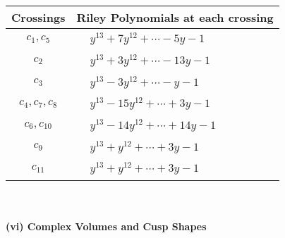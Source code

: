 \documentclass[1p]{elsarticle_modified}
\theoremstyle{definition}
\begin{document}
\begin{tabular}{m{50pt}|m{274pt}}
Crossings & \hspace{64pt}Riley Polynomials at each crossing \\
\hline $$\begin{aligned}c_{1},c_{5}\end{aligned}$$&$\begin{aligned}
&y^{13}+7 y^{12}+\cdots-5 y-1
\end{aligned}$\\
\hline $$\begin{aligned}c_{2}\end{aligned}$$&$\begin{aligned}
&y^{13}+3 y^{12}+\cdots-13 y-1
\end{aligned}$\\
\hline $$\begin{aligned}c_{3}\end{aligned}$$&$\begin{aligned}
&y^{13}-3 y^{12}+\cdots- y-1
\end{aligned}$\\
\hline $$\begin{aligned}c_{4},c_{7},c_{8}\end{aligned}$$&$\begin{aligned}
&y^{13}-15 y^{12}+\cdots+3 y-1
\end{aligned}$\\
\hline $$\begin{aligned}c_{6},c_{10}\end{aligned}$$&$\begin{aligned}
&y^{13}-14 y^{12}+\cdots+14 y-1
\end{aligned}$\\
\hline $$\begin{aligned}c_{9}\end{aligned}$$&$\begin{aligned}
&y^{13}+y^{12}+\cdots+3 y-1
\end{aligned}$\\
\hline $$\begin{aligned}c_{11}\end{aligned}$$&$\begin{aligned}
&y^{13}+y^{12}+\cdots+3 y-1
\end{aligned}$\\
\hline
\end{tabular}\\~\\
\newpage\flushleft \textbf{(vi) Complex Volumes and Cusp Shapes}
\end{document}
